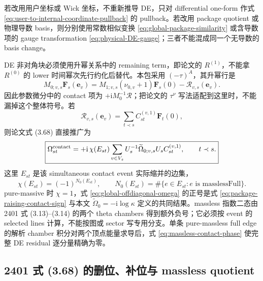 \documentclass[11pt,a4paper]{ctexart}
\newcommand{\ii}{\mathrm i}
\newcommand{\cR}{\mathcal R}
\begin{document}
若改用用户坐标或 Wick 坐标，不重新推导 DE，只对 differential one-form 作式 \eqref{eq:user-to-internal-coordinate-pullback} 的 pullback。若改用 package quotient 或物理导数 basis，则分别使用常数相似变换 \eqref{eq:global-package-similarity} 或含导数项的 gauge transformation \eqref{eq:physical-DE-gauge}；三者不能混成同一个无导数的 basis change。

DE 非对角块必须使用升幂关系中的 remaining term，即论文的 $R^{(1)}$，不能拿 $R^{(0)}$ 的 lower 时间幂次先行约化后替代。本包采用 $(-\tau)^A$，其升幂行是
\begin{equation}
 M_{0;v,s}\bm F_s(\bm e_v)
 =M_{1;v,s}(\nu_{0,v}+1)\bm F_s(0)-\cR_{v,s}(\bm e_v).
 \label{eq:package-raising-contact-sign}
\end{equation}
因此参数微分中的 contact 项为 $+\ii M_0^{-1}\cR$；把论文的 $\tau^\nu$ 写法适配到这里时，不能漏掉这个整体符号。若
\begin{equation}
 \cR_{v,s}(\bm e_v)=\sum_{t\prec s}C_{st}^{(v,1)}\bm F_t(0),
\end{equation}
则论文式 (3.68) 直接推广为
\begin{equation}
 \boxed{
 \Omega_{st}^{\rm contact}
 =+\ii\,\chi(E_{st})\sum_{v\in V_s}
 U_s^{-1}\widetilde\Omega_{0;v,s}U_s
 C_{st}^{(v,1)},
 \qquad t\prec s.
 }
 \label{eq:global-offdiagonal-omega}
\end{equation}
这里 $E_{st}$ 是该 simultaneous contact event 实际缩并的边集，
\begin{equation}
 \chi(E_{st})=(-1)^{N_0(E_{st})},
 \qquad
 N_0(E_{st})=\#\{e\in E_{st}:e\text{ is masslessFull}\}.
 \label{eq:massless-contact-phase}
\end{equation}
pure-massive 时 $\chi=1$，式 \eqref{eq:global-offdiagonal-omega} 的正号是式 \eqref{eq:package-raising-contact-sign} 与本文 $\widetilde\Omega_0=-\ii\log\kappa$ 定义的共同结果。massless 指数二态由 2401 式 (3.13)--(3.14) 的两个 theta chambers 得到额外负号；它必须按 event 的 selected lines 计算，不能按图或 sector 写专用分支。单条 pure-massless full edge 的解析 chamber 积分对两个顶点能量求导后，式 \eqref{eq:massless-contact-phase} 使完整 DE residual 逐分量精确为零。

\subsection{2401 式 (3.68) 的删位、补位与 massless quotient}
\end{document}
